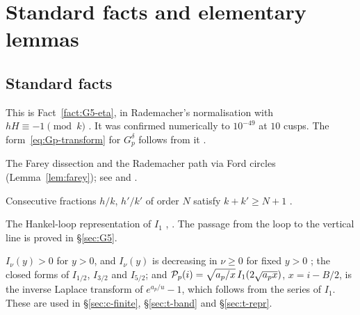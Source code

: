 \section{Standard facts and elementary lemmas}\label{app:facts}

\subsection{Standard facts}
\begin{fact}\label{fact:eta}
This is Fact~\ref{fact:G5-eta}, in Rademacher's normalisation with $hH\equiv-1\pmod k$ \cite[Thm~5.1]{Apostol}. It was
confirmed numerically to $10^{-49}$ at $10$ cusps. The form~\eqref{eq:Gp-transform} for $G_p^\delta$ follows from it
\cite{SZ,Padhi_SZ}.
\end{fact}

\begin{fact}\label{fact:farey}
The Farey dissection and the Rademacher path via Ford circles (Lemma~\ref{lem:farey}); see \cite[Ch.~5]{Apostol} and
\cite[Ch.~14]{Rademacher}.
\end{fact}

\begin{fact}\label{fact:neighbours}
Consecutive fractions $h/k$, $h'/k'$ of order $N$ satisfy $k+k'\ge N+1$ \cite[Thm~30]{HardyWright}.
\end{fact}

\begin{fact}\label{fact:bessel-int}
The Hankel-loop representation of $I_1$ \cite[10.9.19]{DLMF}, \cite[\S6.22]{Watson}. The passage from the loop to the
vertical line is proved in \S\ref{sec:G5}.
\end{fact}

\begin{fact}\label{fact:bessel}
$I_\nu(y)>0$ for $y>0$, and $I_\nu(y)$ is decreasing in $\nu\ge0$ for fixed $y>0$ \cite{Cochran,Watson}; the closed forms of
$I_{1/2}$, $I_{3/2}$ and $I_{5/2}$; and $\mathcal P_p(i)=\sqrt{a_p/x}\,I_1(2\sqrt{a_px})$, $x=i-B/2$, is the inverse Laplace
transform of $e^{a_p/u}-1$, which follows from the series of $I_1$. These are used in \S\ref{sec:c-finite},
\S\ref{sec:t-band} and \S\ref{sec:t-repr}.
\end{fact}

